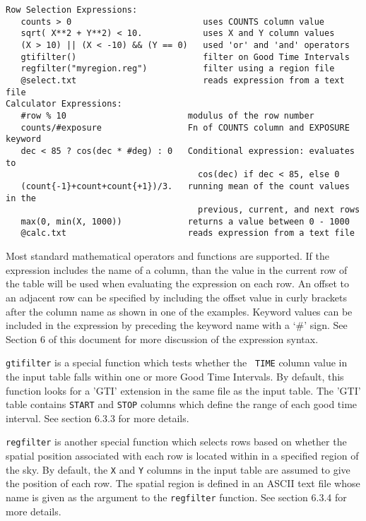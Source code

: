 \documentclass[11pt]{article}
\begin{document}
\begin{verbatim}
Row Selection Expressions:
   counts > 0                          uses COUNTS column value
   sqrt( X**2 + Y**2) < 10.            uses X and Y column values
   (X > 10) || (X < -10) && (Y == 0)   used 'or' and 'and' operators  
   gtifilter()                         filter on Good Time Intervals
   regfilter("myregion.reg")           filter using a region file
   @select.txt                         reads expression from a text file
Calculator Expressions:
   #row % 10                        modulus of the row number
   counts/#exposure                 Fn of COUNTS column and EXPOSURE keyword
   dec < 85 ? cos(dec * #deg) : 0   Conditional expression: evaluates to
                                      cos(dec) if dec < 85, else 0
   (count{-1}+count+count{+1})/3.   running mean of the count values in the
                                      previous, current, and next rows
   max(0, min(X, 1000))             returns a value between 0 - 1000
   @calc.txt                        reads expression from a text file
\end{verbatim}

Most standard mathematical operators and functions are supported.  If
the expression includes the name of a column, than the value in the
current row of the table will be used when evaluating the expression on
each row.   An offset to an adjacent row can be specified by including
the offset value in curly brackets after the column name as shown in
one of the examples.  Keyword values can be included in the expression
by preceding the keyword name with a `\#' sign.   See Section 6 of this
document for more discussion of the expression syntax.

{\tt gtifilter} is a special function which tests whether the {\tt
TIME} column value in the input table falls within one or more Good
Time Intervals.  By default, this function looks for a 'GTI' extension
in the same file as the input table.  The 'GTI' table contains {\tt START} and {\tt STOP} columns which define the range of
each good time interval. See section 6.3.3 for more details.

{\tt regfilter} is another special function which selects rows based on
whether the spatial position associated with each row is located within
in a specified region of the sky.  By default, the {\tt X} and {\tt Y}
columns in the input table are assumed to give the position of each row.
The spatial region is defined in an ASCII text file whose name is given
as the argument to the {\tt regfilter} function. See section 6.3.4 for
more details.
\end{document}
